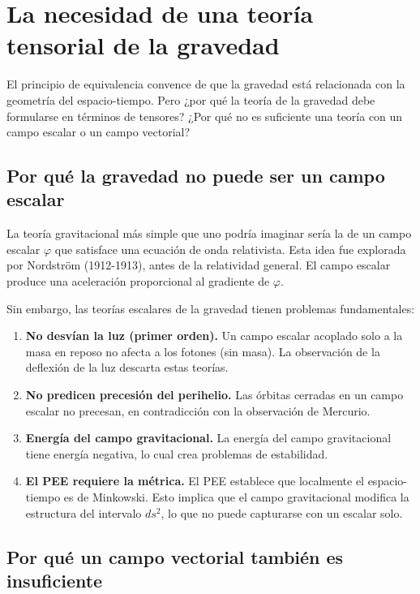 \section{La necesidad de una teoría tensorial de la gravedad}
\label{sec:necesidad_tensorial}

El principio de equivalencia convence de que la gravedad está relacionada con la geometría del espacio-tiempo. Pero ¿por qué la teoría de la gravedad debe formularse en términos de tensores? ¿Por qué no es suficiente una teoría con un campo escalar o un campo vectorial?

\subsection{Por qué la gravedad no puede ser un campo escalar}

La teoría gravitacional más simple que uno podría imaginar sería la de un campo escalar $\varphi$ que satisface una ecuación de onda relativista. Esta idea fue explorada por Nordström (1912-1913), antes de la relatividad general. El campo escalar produce una aceleración proporcional al gradiente de $\varphi$.

Sin embargo, las teorías escalares de la gravedad tienen problemas fundamentales:
\begin{enumerate}[leftmargin=2em]
  \item \textbf{No desvían la luz (primer orden).} Un campo escalar acoplado solo a la masa en reposo no afecta a los fotones (sin masa). La observación de la deflexión de la luz descarta estas teorías.
  \item \textbf{No predicen precesión del perihelio.} Las órbitas cerradas en un campo escalar no precesan, en contradicción con la observación de Mercurio.
  \item \textbf{Energía del campo gravitacional.} La energía del campo gravitacional tiene energía negativa, lo cual crea problemas de estabilidad.
  \item \textbf{El PEE requiere la métrica.} El PEE establece que localmente el espacio-tiempo es de Minkowski. Esto implica que el campo gravitacional modifica la estructura del intervalo $ds^2$, lo que no puede capturarse con un escalar solo.
\end{enumerate}

\subsection{Por qué un campo vectorial también es insuficiente}


